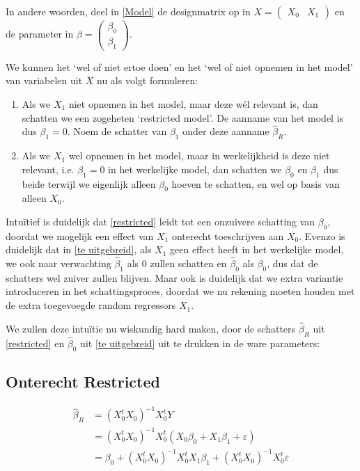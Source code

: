 \documentclass[a4paper]{report}
\begin{document}
  In andere woorden, deel in \ref{Model} de designmatrix op in $X = \begin{pmatrix} X_0 & X_1 \end{pmatrix}$ en de parameter in ${\beta = \begin{pmatrix} \beta_0 \\ \beta_1 \end{pmatrix}}$. 
  
  We kunnen het `wel of niet ertoe doen' en het `wel of niet opnemen in het model' van variabelen uit $X$ nu als volgt formuleren:
  
  \begin{enumerate}
  \item \label{restricted} Als we $X_1$ niet opnemen in het model, maar deze w\' el relevant is, dan schatten we een zogeheten `restricted model'. De aanname van het model is dus $\beta_1 = 0$. Noem de schatter van $\beta_1$ onder deze aanname $\hat{\beta}_R$.
  
  \item \label{te uitgebreid} Als we $X_1$ wel opnemen in het model, maar in werkelijkheid is deze niet relevant, i.e. $\beta_1 = 0$ in het werkelijke model, dan schatten we $\beta_0$ en $\beta_1$ dus beide terwijl we eigenlijk alleen $\beta_0$ hoeven te schatten, en wel op basis van alleen $X_0$.
  \end{enumerate}
  
  Intu\"itief is duidelijk dat \ref{restricted} leidt tot een onzuivere schatting van $\beta_0$, doordat we mogelijk een effect van $X_1$ onterecht toeschrijven aan $X_0$. Evenzo is duidelijk dat in \ref{te uitgebreid}, als $X_1$ geen effect heeft in het werkelijke model, we ook naar verwachting $\hat{\beta}_1$ als 0 zullen schatten en $\hat{\beta}_0$ als $\beta_0$, dus dat de schatters wel zuiver zullen blijven. Maar ook is duidelijk dat we extra variantie introduceren in het schattingsproces, doordat we nu rekening moeten houden met de extra toegevoegde random regressors $X_1$.
  
  We zullen deze intu\"itie nu wiskundig hard maken, door de schatters $\hat{\beta}_R$ uit \ref{restricted} en $\hat{\beta}_0$ uit \ref{te uitgebreid} uit te drukken in de ware parameters:
  
\subsection{Onterecht Restricted}

  \begin{align*}
  \hat{\beta}_R &= (X_0^tX_0)^{-1}X_0^tY \\ 
  &= (X_0^tX_0)^{-1}X_0^t(X_0\beta_0 + X_1\beta_1 + \varepsilon) \\
  &= \beta_0 + (X_0^tX_0)^{-1}X_0^tX_1\beta_1 + (X_0^tX_0)^{-1}X_0^t\varepsilon
  \end{align*}
  
\end{document}
